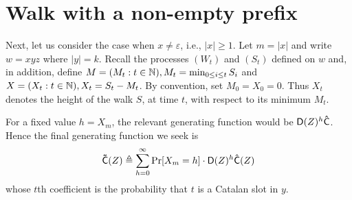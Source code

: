 \section{Walk with a non-empty prefix}
  Next, let us consider the case when $x \neq \varepsilon$, i.e., $|x| \geq 1$. 
  Let $m = |x|$ and write $w = xyz$ where $|y| = k$. 
  Recall the processes $(W_t)$ and $(S_t)$ defined on $w$
  and, in addition, define $M = (M_t : t \in \mathbb{N}), M_t = \min_{0 \leq i \leq t } S_i$ 
  and $X = (X_t : t \in \mathbb{N}), X_t = S_t - M_t$. 
  By convention, set $M_0 = X_0 = 0$. 
  Thus $X_t$ denotes the height of the walk $S$, at time $t$, 
  with respect to its minimum $M_t$.

  For a fixed value $h = X_m$, the relevant generating function 
  would be $\mathsf{D}(Z)^{h}\mathsf{\hat{C}}$. 
  Hence the final generating function we seek is
  $$
    \mathsf{\tilde{C}}(Z) \triangleq \sum_{h = 0}^\infty \Pr[X_m = h] \cdot \mathsf{D}(Z)^h  \mathsf{\hat{C}}(Z)
  $$
  whose $t$th coefficient is the probability that 
  $t$ is a Catalan slot in $y$.

